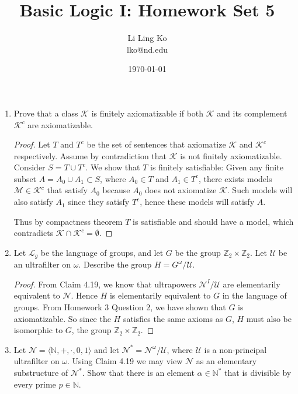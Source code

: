 \documentclass{article}
\begin{document}
\title{Basic Logic I: Homework Set 5}
\author{Li Ling Ko\\ lko@nd.edu}
\date{\today}
\maketitle

\begin{enumerate}
  \item Prove that a class $\mathcal{K}$ is finitely axiomatizable if both
    $\mathcal{K}$ and its complement $\mathcal{K}^c$ are axiomatizable.
    \begin{proof}
      Let $T$ and $T^c$ be the set of sentences that axiomatize
      $\mathcal{K}$ and $\mathcal{K}^c$ respectively. Assume by
      contradiction that $\mathcal{K}$ is not finitely axiomatizable.
      Consider $S=T\cup T^c$. We show that $T$ is finitely satisfiable:
      Given any finite subset $A=A_0\cup A_1\subset S$, where $A_0\in T$ and
      $A_1\in T^c$, there exists models $\mathcal{M}\in\mathcal{K}^c$ that
      satisfy $A_0$ because $A_0$ does not axiomatize $\mathcal{K}$. Such
      models will also satisfy $A_1$ since they satisfy $T^c$, hence these
      models will satisfy $A$.

      Thus by compactness theorem $T$ is satisfiable and should have a
      model, which contradicts $\mathcal{K}\cap\mathcal{K}^c=\emptyset$.
    \end{proof}

  \item Let $\mathcal{L}_g$ be the language of groups, and let $G$ be the
    group $\mathbb{Z}_2\times\mathbb{Z}_2$. Let $\mathcal{U}$ be an
    ultrafilter on $\omega$. Describe the group $H=G^\omega/\mathcal{U}$.

    \begin{proof}
      From Claim 4.19, we know that ultrapowers $\mathcal{N}^I/\mathcal{U}$
      are elementarily equivalent to $\mathcal{N}$. Hence $H$ is
      elementarily equivalent to $G$ in the language of groups. From
      Homework 3 Question 2, we have shown that $G$ is axiomatizable. So
      since the $H$ satisfies the same axioms as $G$, $H$ must also be
      isomorphic to $G$, the group $\mathbb{Z}_2\times\mathbb{Z}_2$.
    \end{proof}

  \item Let $\mathcal{N}=\langle\mathbb{N},+,\cdot,0,1\rangle$ and let
    $\mathcal{N}^*=\mathcal{N}^\omega/\mathcal{U}$, where $\mathcal{U}$ is
    a non-principal ultrafilter on $\omega$. Using Claim 4.19 we may view
    $\mathcal{N}$ as an elementary substructure of $\mathcal{N}^*$. Show
    that there is an element $\alpha\in\mathbb{N}^*$ that is divisible by
    every prime $p\in\mathbb{N}$.


\end{enumerate}
\end{document}
